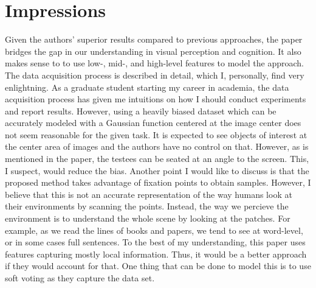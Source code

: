 \documentclass[11pt]{article}
\begin{document}
\section{Impressions}
Given the authors' superior results compared to previous approaches, the paper bridges the gap in our understanding in visual perception and cognition.
It also makes sense to to use low-, mid-, and high-level features to model the approach.
The data acquisition process is described in detail, which I, personally, find very enlightning.
As a graduate student starting my career in academia, the data acquisition process has given me intuitions on how I should conduct experiments and report results.
However, using a heavily biased dataset which can be accurately modeled with a Gaussian function centered at the image center does not seem reasonable for the given task.
It is expected to see objects of interest at the center area of images and the authors have no control on that.
However, as is mentioned in the paper, the testees can be seated at an angle to the screen. This, I suspect, would reduce the bias.
Another point I would like to discuss is that the proposed method takes advantage of fixation points to obtain samples.
However, I believe that this is not an accurate representation of the way humans look at their environments by scanning the points.
Instead, the way we percieve the environment is to understand the whole scene by looking at the patches.
For example, as we read the lines of books and papers, we tend to see at word-level, or in some cases full sentences.
To the best of my understanding, this paper uses features capturing mostly local information.
Thus, it would be a better approach if they would account for that.
One thing that can be done to model this is to use soft voting as they capture the data set.
% 
% 
\end{document}
